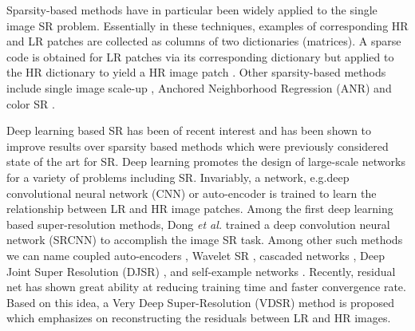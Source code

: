 \documentclass[9pt]{article}
\begin{document}
Sparsity-based methods have in particular been widely applied to the single image SR problem. Essentially in these techniques, examples of corresponding HR and LR patches are collected as columns of two dictionaries (matrices). A sparse code is obtained for LR patches via its corresponding dictionary but applied to the HR dictionary to yield a HR image patch \cite{YangAndWright:SparseSR_TIP2010}. Other sparsity-based methods include  single image scale-up \cite{Zeyde:SR_Springer2012}, Anchored Neighborhood Regression (ANR) \cite{Timofte:AnchoredANR_ICCV2013, Timofte:AnchoredARN+_ACCV2014} and color SR \cite{mousavi2017ColorSR_TIP}.


Deep learning based SR has been of recent interest and has been shown to improve results over sparsity based methods which were previously considered state of the art for SR. Deep learning promotes the design of large-scale networks \cite{hinton2006fast,bengio2007greedy,poultney2006efficient} for a variety of problems including SR. Invariably, a network, e.g.\a deep convolutional neural network (CNN) or auto-encoder is trained to learn the relationship between LR and HR image patches.
Among the first deep learning based super-resolution methods, Dong \emph{et al.} \cite{dong2014learning} trained a deep convolution neural network (SRCNN) to accomplish the image SR task. %
Among other such methods we can name coupled auto-encoders \cite{tiantong16deep}, Wavelet SR \cite{guo2017DWSR_CVPR}, cascaded networks  \cite{cui2014deep},  Deep Joint Super Resolution (DJSR)  \cite{wang2015self}, and self-example networks \cite{huang2015single}.
Recently, residual net \cite{he2016deep} has shown great ability at reducing training time and faster convergence rate. Based on this idea, a Very Deep Super-Resolution (VDSR) \cite{Kim_2016_VDSR} method is proposed which emphasizes on reconstructing the residuals between LR and HR images.
\end{document}
